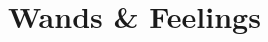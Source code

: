 \documentclass[10pt,twoside,twocolumn]{article}
\begin{document}
%

\section{Wands \& Feelings}
\end{document}
